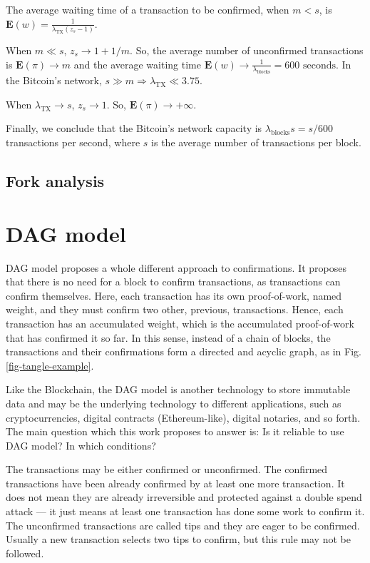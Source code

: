 The average waiting time of a transaction to be confirmed, when $m < s$, is $\mathbf{E}(w) = \frac{1}{\lambda_{\text{TX}} (z_s-1)}$.

When $m \ll s$, $z_s \rightarrow 1 + 1/m$. So, the average number of unconfirmed transactions is $\mathbf{E}(\pi) \rightarrow m$ and the average waiting time $\mathbf{E}(w) \rightarrow \frac{1}{\lambda_{\text{blocks}}} = 600 \text{ seconds}$. In the Bitcoin's network, $s \gg m \Rightarrow \lambda_{\text{TX}} \ll 3.75$.

When $\lambda_{\text{TX}} \rightarrow s$, $z_s \rightarrow 1$. So, $\mathbf{E}(\pi) \rightarrow +\infty$.

Finally, we conclude that the Bitcoin's network capacity is $\lambda_{\text{blocks}} s = s/600$ transactions per second, where $s$ is the average number of transactions per block.


\section{Fork analysis}


\chapter{DAG model}

DAG model proposes a whole different approach to confirmations. It proposes that there is no need for a block to confirm transactions, as transactions can confirm themselves. Here, each transaction has its own proof-of-work, named weight, and they must confirm two other, previous, transactions. Hence, each transaction has an accumulated weight, which is the accumulated proof-of-work that has confirmed it so far. In this sense, instead of a chain of blocks, the transactions and their confirmations form a directed and acyclic graph, as in Fig. \ref{fig-tangle-example}.

Like the Blockchain, the DAG model is another technology to store immutable data and may be the underlying technology to different applications, such as cryptocurrencies, digital contracts (Ethereum-like), digital notaries, and so forth. The main question which this work proposes to answer is: Is it reliable to use DAG model? In which conditions?

The transactions may be either confirmed or unconfirmed. The confirmed transactions have been already confirmed by at least one more transaction. It does not mean they are already irreversible and protected against a double spend attack --- it just means at least one transaction has done some work to confirm it. The unconfirmed transactions are called tips and they are eager to be confirmed. Usually a new transaction selects two tips to confirm, but this rule may not be followed.

